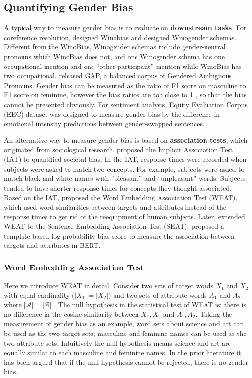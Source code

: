 \subsection{Quantifying Gender Bias}
A typical way to measure gender bias is to evaluate on \textbf{downstream tasks}. For coreference resolution, \citet{zhao2018gender} designed Winobias and \citet{rudinger2018gender} designed Winogender schemas. Different from the WinoBias, Winogender schemas include gender-neutral pronouns which WinoBias does not, and one Winogender schema has one occupational mention and one “other participant” mention while WinoBias has two occupational. \citet{webster2018mind} released GAP, a balanced corpus of Gendered Ambiguous Pronouns. Gender bias can be measured as the ratio of F1 score on masculine to F1 score on feminine, however the bias ratios are too close to 1 \citep{Chada_2019, Attree_2019}, so that the bias cannot be presented obviously. For sentiment analysis, Equity Evaluation Corpus (EEC) dataset \citep{Kiritchenko_2018} was designed to measure gender bias by the difference in emotional intensity predictions between gender-swapped sentences.

An alternative way to measure gender bias is based on \textbf{association tests}, which originated from sociological research. \citet{greenwald1998measuring} proposed the Implicit Association Test (IAT) to quantified societal bias. In the IAT, response times were recorded when subjects were asked to match two concepts. For example, subjects were asked to match black and white names with “pleasant” and “unpleasant” words. Subjects tended to have shorter response times for concepts they thought associated. Based on the IAT, \citet{caliskan2017semantics} proposed the Word Embedding Association Test (WEAT), which used word similarities between targets and attributes instead of the response times to get rid of the reequipment of human subjects. Later, \citet{may2019measuring} extended WEAT to the Sentence Embedding Association Test (SEAT); \citet{kurita2019measuring} proposed a template-based log probability bias score to measure the association between targets and attributes in BERT.

\subsubsection{Word Embedding Association Test}
\label{sec:weat}
Here we introduce WEAT in detail. Consider two sets of target words $X_1$ and $X_2$ with equal cardinality ($|X_1|=|X_2|$) and two sets of attribute words $A_1$ and $A_2$ where $|\mathcal{A}|=|\mathcal{B}|$ . The null hypothesis in the statistical test of WEAT is: there is no difference in the cosine similarity between $X_1,X_2$ and $
A_1,A_2$. Taking the measurement of gender bias as an example, word sets about science and art can be used as the two target sets, masculine and feminine names can be used as the two attribute sets. Intuitively the null hypothesis means science and art are equally similar to each masculine and feminine names. In the prior literature it has been argued that if the null hypothesis cannot be rejected, there is no gender bias. 


